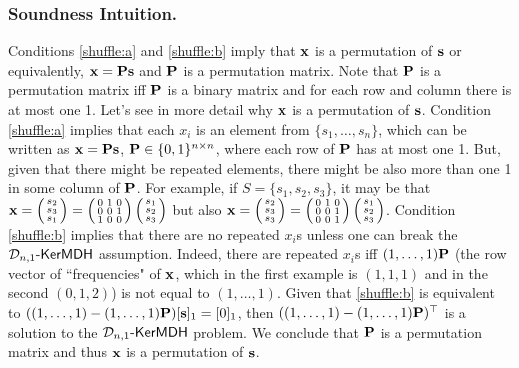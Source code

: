 \subsubsection{Soundness Intuition.} Conditions \ref{shuffle:a} and \ref{shuffle:b} imply that $\mathbf{x}$ is a permutation of $\mathbf{s}$ or equivalently, $\mathbf{{x}}=\mathbf{{P}}\mathbf{s}$ and $\mathbf{{P}}$ is a permutation matrix. Note that $\mathbf{{P}}$ is a permutation matrix iff $\mathbf{{P}}$ is a binary matrix and for each row and column there is at most one 1. Let's see in more detail why $\mathbf{x}$ is a permutation of $\mathbf{s}$. Condition \ref{shuffle:a} implies that each $x_i$ is an element from $\{s_1,\ldots,s_n\}$, which can be written as $\mathbf{x}=\mathbf{{P}}\mathbf{s}$, $\mathbf{{P}}\in\{0,1\}^{n\times n}$, where each row of $\mathbf{{P}}$ has at most one 1. But, given that there might be repeated elements, there might be also more than one 1 in some column of $\mathbf{{P}}$. For example, if $S=\{s_1,s_2,s_3\}$, it may be that $\mathbf{x}=\left(\begin{smallmatrix}s_2\\s_3\\s_1\end{smallmatrix}\right)=\left(\begin{smallmatrix}0&1&0\\0&0&1\\1&0&0\end{smallmatrix}\right)\left(\begin{smallmatrix}s_1\\s_2\\s_3\end{smallmatrix}\right)$ but also $\mathbf{x}=\left(\begin{smallmatrix}s_2\\s_3\\s_3\end{smallmatrix}\right)=\left(\begin{smallmatrix}0&1&0\\0&0&1\\0&0&1\end{smallmatrix}\right)\left(\begin{smallmatrix}s_1\\s_2\\s_3\end{smallmatrix}\right)$. Condition \ref{shuffle:b} implies that there are no repeated $x_i$s unless one can break the $\mathcal{D}_{n,1}\mbox{-}\mathsf{KerMDH}$ assumption. Indeed, there are repeated $x_i$s iff  $(1,\ldots,1)\mathbf{{P}}$ (the row vector of ``frequencies" of $\mathbf{x}$, which in the first example is $(1,1,1)$ and in the second $(0,1,2)$) is not equal to $ (1,\ldots,1)$. Given that \ref{shuffle:b} is equivalent to $((1,\ldots,1)-(1,\ldots,1)\mathbf{{P}})[\mathbf{s}]_1=[0]_1$, then $((1,\ldots,1)-(1,\ldots,1)\mathbf{{P}})^\top$ is a solution to the $\mathcal{D}_{n,1}\mbox{-}\mathsf{KerMDH}$ problem. We conclude that $\mathbf{{P}}$ is a permutation matrix and thus $\mathbf{x}$ is a permutation of $\mathbf{s}$.

